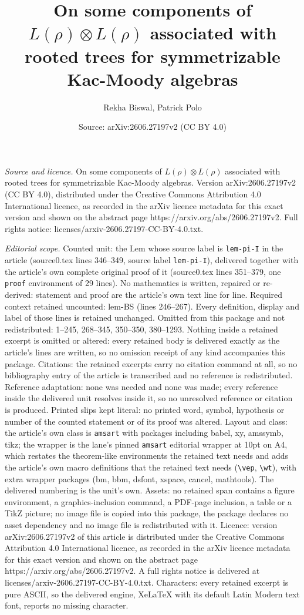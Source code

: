 \documentclass[10pt,a4paper]{amsart}
\title[On some components of $L(\rho)\otimes L(\rho)$ associated wi]{On some components of $L(\rho)\otimes L(\rho)$ associated with rooted trees for symmetrizable Kac-Moody algebras}
\author{Rekha Biswal, Patrick Polo}
\date{Source: arXiv:2606.27197v2 (CC BY 4.0)}
\begin{document}
\maketitle

\noindent\emph{Source and licence.} On some components of $L(\rho)\otimes L(\rho)$ associated with rooted trees for symmetrizable Kac-Moody algebras. Version arXiv:2606.27197v2 (CC BY 4.0), distributed under the Creative Commons Attribution 4.0 International licence, as recorded in the arXiv licence metadata for this exact version and shown on the abstract page https://arxiv.org/abs/2606.27197v2. Full rights notice: licenses/arxiv-2606.27197-CC-BY-4.0.txt.\par\smallskip

\noindent\textit{Editorial scope.} Counted unit: the Lem whose source label is \texttt{lem-pi-I} in the article (source0.tex lines 346--349, source label \texttt{lem-pi-I}), delivered together with the article's own complete original proof of it (source0.tex lines 351--379, one \texttt{proof} environment of 29 lines). No mathematics is written, repaired or re-derived: statement and proof are the article's own text line for line. Required context retained uncounted: lem-BS (lines 246--267). Every definition, display and label of those lines is retained unchanged. Omitted from this package and not redistributed: 1--245, 268--345, 350--350, 380--1293. Nothing inside a retained excerpt is omitted or altered: every retained body is delivered exactly as the article's lines are written, so no omission receipt of any kind accompanies this package. Citations: the retained excerpts carry no citation command at all, so no bibliography entry of the article is transcribed and no reference is redistributed. Reference adaptation: none was needed and none was made; every reference inside the delivered unit resolves inside it, so no unresolved reference or citation is produced. Printed slips kept literal: no printed word, symbol, hypothesis or number of the counted statement or of its proof was altered. Layout and class: the article's own class is \texttt{amsart} with packages including babel, xy, amssymb, tikz; the wrapper is the lane's pinned \texttt{amsart} editorial wrapper at 10pt on A4, which restates the theorem-like environments the retained text needs and adds the article's own macro definitions that the retained text needs (\texttt{\textbackslash vep}, \texttt{\textbackslash wt}), with extra wrapper packages (bm, bbm, dsfont, xspace, cancel, mathtools). The delivered numbering is the unit's own. Assets: no retained span contains a figure environment, a graphics-inclusion command, a PDF-page inclusion, a table or a TikZ picture; no image file is copied into this package, the package declares no asset dependency and no image file is redistributed with it. Licence: version arXiv:2606.27197v2 of this article is distributed under the Creative Commons Attribution 4.0 International licence, as recorded in the arXiv licence metadata for this exact version and shown on the abstract page https://arxiv.org/abs/2606.27197v2. A full rights notice is delivered at licenses/arxiv-2606.27197-CC-BY-4.0.txt. Characters: every retained excerpt is pure ASCII, so the delivered engine, XeLaTeX with its default Latin Modern text font, reports no missing character.
\end{document}
